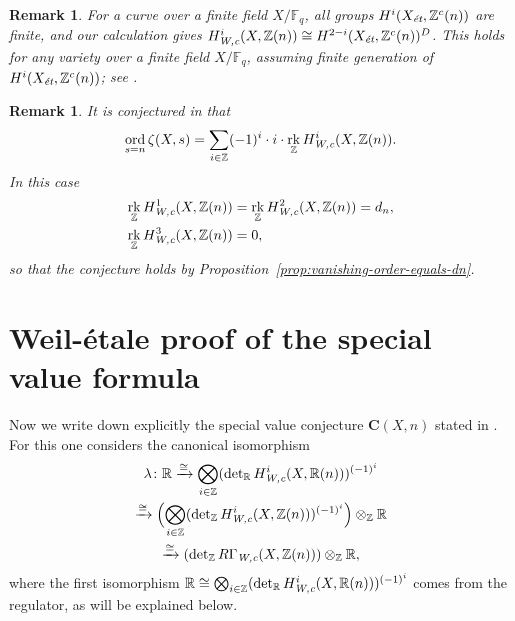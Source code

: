 \documentclass[draft]{article}
\DeclareMathOperator{\ord}{ord}
\DeclareMathOperator{\rk}{rk}
\newcommand{\FF}{\mathbb{F}}
\newcommand{\RR}{\mathbb{R}}
\newcommand{\ZZ}{\mathbb{Z}}
\renewcommand{\det}{\operatorname{det}}
\newcommand{\et}{\text{\it \'{e}t}}
\newcommand{\Wc}{\text{\it W,c}}
\theoremstyle{myplain}
\theoremstyle{mydefinition}
\newtheorem{remark}[theorem]{Remark}
\numberwithin{equation}{section}
\begin{document}
\begin{remark}
  For a curve over a finite field $X/\FF_q$, all groups $H^i (X_\et, \ZZ^c(n))$
  are finite, and our calculation gives
  $H^i_\Wc (X, \ZZ(n)) \cong H^{2-i} (X_\et, \ZZ^c(n))^D$.
  This holds for any variety over a finite field $X/\FF_q$, assuming finite
  generation of $H^i (X_\et, \ZZ^c(n))$; see
  \cite[Proposition~7.7]{Beshenov-Weil-etale-1}.
\end{remark}

\begin{remark}
  It is conjectured in \cite[\S 3]{Beshenov-Weil-etale-2} that
  \[ \ord_{s = n} \zeta (X,s) =
    \sum_{i\in \ZZ} (-1)^i\cdot i\cdot\rk_\ZZ H^i_\Wc (X,\ZZ(n)). \]
  In this case
  \begin{align*}
    \rk_\ZZ H^1_\Wc (X,\ZZ(n)) & = \rk_\ZZ H^2_\Wc (X,\ZZ(n)) = d_n, \\
    \rk_\ZZ H^3_\Wc (X,\ZZ(n)) & = 0,
  \end{align*}
  so that the conjecture holds by
  Proposition~\ref{prop:vanishing-order-equals-dn}.
\end{remark}


\section{Weil-\'{e}tale proof of the special value formula}
\label{sec:Weil-etale-proof}

Now we write down explicitly the special value conjecture $\mathbf{C} (X,n)$
stated in \cite[\S 4]{Beshenov-Weil-etale-2}. For this one considers the
canonical isomorphism
\begin{multline*}
  \lambda\colon \RR \xrightarrow{\cong}
  \bigotimes_{i\in \ZZ} (\det_\RR H^i_\Wc (X, \RR (n)))^{(-1)^i} \\
  \xrightarrow{\cong} \Bigl(\bigotimes_{i\in \ZZ} (\det_\ZZ H^i_\Wc (X, \ZZ (n)))^{(-1)^i}\Bigr) \otimes_\ZZ \RR \\
  \xrightarrow{\cong} (\det_\ZZ R\Gamma_\Wc (X, \ZZ (n))) \otimes_\ZZ \RR,
\end{multline*}
where the first isomorphism
$\RR \cong \bigotimes_{i\in \ZZ} (\det_\RR H^i_\Wc (X, \RR (n)))^{(-1)^i}$
comes from the regulator, as will be explained below.

\vspace{1em}
\end{document}
